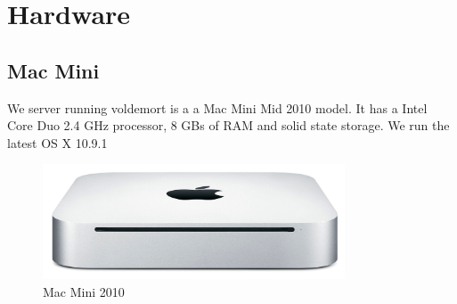 \clearpage

\section{Hardware}
\label{sec:hardware}

\subsection{Mac Mini}
We server running voldemort is a a Mac Mini Mid 2010 model. It has a Intel Core Duo 2.4 GHz processor, 8 GBs of RAM and solid state storage. We run the latest OS X 10.9.1

\begin{figure}[h]
    \centering
    \includegraphics[width=0.8\textwidth]{hardware/mac-mini-06-2010}
    \caption{Mac Mini 2010}
    \label{fig:macmini_hw}
\end{figure}


